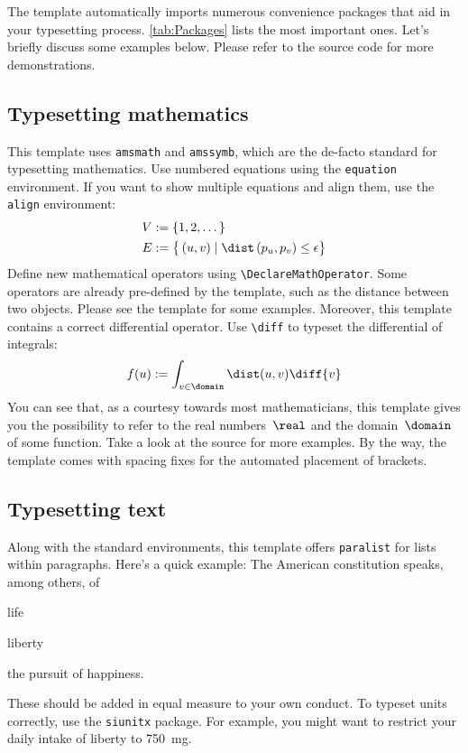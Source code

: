The template automatically imports numerous convenience packages that
aid in your typesetting process. \autoref{tab:Packages} lists the
most important ones. Let's briefly discuss some examples below. Please
refer to the source code for more demonstrations.

\subsection{Typesetting mathematics}

This template uses \verb|amsmath| and \verb|amssymb|, which are the
de-facto standard for typesetting mathematics. Use numbered equations
using the \verb|equation| environment.
%
If you want to show multiple equations and align them, use the
\verb|align| environment:
%
\begin{align}
    V &:= \{ 1, 2, \dots \}\\
    E &:= \big\{ \left(u,v\right) \mid \dist\left(p_u, p_v\right) \leq \epsilon \big\}
\end{align}
%
Define new mathematical operators using \verb|\DeclareMathOperator|.
Some operators are already pre-defined by the template, such as the
distance between two objects. Please see the template for some examples. 
%
Moreover, this template contains a correct differential operator. Use \verb|\diff| to typeset the differential of integrals:
%
\begin{equation}
  f(u) := \int_{v \in \domain}\dist(u,v)\diff{v}
\end{equation}
%
You can see that, as a courtesy towards most mathematicians, this
template gives you the possibility to refer to the real numbers~$\real$
and the domain~$\domain$ of some function. Take a look at the source for
more examples. By the way, the template comes with spacing fixes for the
automated placement of brackets.

\subsection{Typesetting text}

Along with the standard environments, this template offers
\verb|paralist| for lists within paragraphs.
%
Here's a quick example: The American constitution speaks, among others, of
%
\begin{inparaenum}[(i)]
  \item life
  \item liberty
  \item the pursuit of happiness.
\end{inparaenum}
%
These should be added in equal measure to your own conduct. To typeset
units correctly, use the \verb|siunitx| package. For example, you might
want to restrict your daily intake of liberty to \SI{750}{\milli\gram}.

